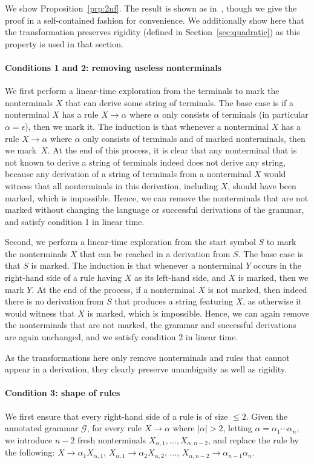 We show Proposition~\ref{prp:2nf}. The result is shown as
in~\cite{lange2009cnf}, though we give the proof in a self-contained fashion for
convenience. We additionally show here that the transformation
preserves rigidity (defined in Section~\ref{sec:quadratic}) as this property is
used in that section.

\paragraph{Conditions 1 and 2: removing useless nonterminals}
We first perform a linear-time exploration from the terminals to mark the
nonterminals $X$ that can derive some string of terminals. The base case is if a nonterminal
$X$ has a rule $X \rightarrow \alpha$ where $\alpha$ only consists of terminals
(in particular $\alpha = \epsilon$), then we mark it.
The induction is that whenever a nonterminal $X$ has a rule $X
\rightarrow \alpha$ where $\alpha$ only consists of terminals and of
marked nonterminals, then we mark~$X$. At the end of this process, it is clear that any nonterminal
that is not known to derive a string of terminals indeed does not derive any
string, because any derivation of a string of terminals from a nonterminal $X$
would witness that all nonterminals in this derivation, including $X$, should
have been marked, which is impossible. Hence, we can remove the nonterminals
that are not marked without changing the language or
successful derivations of the grammar, and satisfy condition 1 in linear time.

Second, we perform a linear-time exploration from the start symbol $S$ to mark the
nonterminals $X$ that can be reached in a derivation from $S$. The base case is
that $S$ is marked. The induction is that whenever a nonterminal $Y$ occurs in
the right-hand side of a rule having $X$ as its left-hand side, and $X$ is
marked, then we mark $Y$. At the end of the process, if a nonterminal $X$ is
not marked, then indeed there is no derivation from $S$ that produces a string
featuring $X$, as otherwise it would witness that $X$ is marked, which is
impossible. Hence, we can again remove the nonterminals that are not marked,
the grammar and successful derivations are again unchanged, and we
satisfy condition 2 in linear time.

As the transformations here only remove nonterminals and rules that cannot
appear in a derivation, they clearly preserve unambiguity as well as rigidity.

\paragraph{Condition 3: shape of rules}
We first ensure that every right-hand side of a rule is of size $\leq 2$.
Given the annotated grammar $\mathcal{G}$, for every rule $X \rightarrow \alpha$ where
$|\alpha| > 2$, letting $\alpha = \alpha_1\cdots\alpha_n$,
we introduce $n-2$ fresh nonterminals $X_{\alpha,1},
\ldots, X_{\alpha,n-2}$, and replace the rule by the following: $X
\rightarrow \alpha_1 X_{\alpha,1}$, $X_{\alpha,1} \rightarrow \alpha_2
X_{\alpha,2}$, ..., $X_{\alpha,n-2} \rightarrow \alpha_{n-1} \alpha_{n}$.

